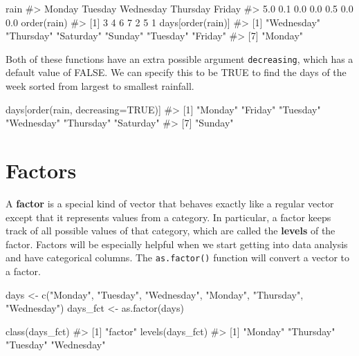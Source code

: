 \documentclass[
  letterpaper,
]{krantz}
\makeatletter
\newenvironment{Shaded}{\begin{snugshade}}{\end{snugshade}}
\newcommand{\AttributeTok}[1]{\textcolor[rgb]{0.40,0.45,0.13}{#1}}
\newcommand{\CommentTok}[1]{\textcolor[rgb]{0.37,0.37,0.37}{#1}}
\newcommand{\ConstantTok}[1]{\textcolor[rgb]{0.56,0.35,0.01}{#1}}
\newcommand{\FunctionTok}[1]{\textcolor[rgb]{0.28,0.35,0.67}{#1}}
\newcommand{\NormalTok}[1]{\textcolor[rgb]{0.00,0.23,0.31}{#1}}
\newcommand{\OtherTok}[1]{\textcolor[rgb]{0.00,0.23,0.31}{#1}}
\newcommand{\StringTok}[1]{\textcolor[rgb]{0.13,0.47,0.30}{#1}}
\newenvironment{kframe}{%
\medskip{}
\setlength{\fboxsep}{.8em}
 \def\at@end@of@kframe{}%
 \ifinner\ifhmode%
  \def\at@end@of@kframe{\end{minipage}}%
  \begin{minipage}{\columnwidth}%
 \fi\fi%
 \def\FrameCommand##1{\hskip\@totalleftmargin \hskip-\fboxsep
 \colorbox{shadecolor}{##1}\hskip-\fboxsep
     \hskip-\linewidth \hskip-\@totalleftmargin \hskip\columnwidth}%
 \MakeFramed {\advance\hsize-\width
   \@totalleftmargin\z@ \linewidth\hsize
   \@setminipage}}%
 {\par\unskip\endMakeFramed%
 \at@end@of@kframe}
\renewenvironment{Shaded}{\begin{kframe}}{\end{kframe}}
\makeatother
\begin{document}
\begin{Shaded}
\begin{Highlighting}[]
\NormalTok{rain}
\CommentTok{\#\textgreater{}    Monday   Tuesday Wednesday  Thursday    Friday                     }
\CommentTok{\#\textgreater{}       5.0       0.1       0.0       0.0       0.5       0.0       0.0}
\FunctionTok{order}\NormalTok{(rain)}
\CommentTok{\#\textgreater{} [1] 3 4 6 7 2 5 1}
\NormalTok{days[}\FunctionTok{order}\NormalTok{(rain)]}
\CommentTok{\#\textgreater{} [1] "Wednesday" "Thursday"  "Saturday"  "Sunday"    "Tuesday"   "Friday"   }
\CommentTok{\#\textgreater{} [7] "Monday"}
\end{Highlighting}
\end{Shaded}

Both of these functions have an extra possible argument
\texttt{decreasing}, which has a default value of FALSE. We can specify
this to be TRUE to find the days of the week sorted from largest to
smallest rainfall.

\begin{Shaded}
\begin{Highlighting}[]
\NormalTok{days[}\FunctionTok{order}\NormalTok{(rain, }\AttributeTok{decreasing=}\ConstantTok{TRUE}\NormalTok{)]}
\CommentTok{\#\textgreater{} [1] "Monday"    "Friday"    "Tuesday"   "Wednesday" "Thursday"  "Saturday" }
\CommentTok{\#\textgreater{} [7] "Sunday"}
\end{Highlighting}
\end{Shaded}

\hypertarget{factors}{%
\section{Factors}\label{factors}}

A \textbf{factor} is a special kind of vector that behaves exactly like
a regular vector except that it represents values from a category. In
particular, a factor keeps track of all possible values of that
category, which are called the \textbf{levels} of the factor. Factors
will be especially helpful when we start getting into data analysis and
have categorical columns. The \texttt{as.factor()} function will convert
a vector to a factor.

\begin{Shaded}
\begin{Highlighting}[]
\NormalTok{days }\OtherTok{\textless{}{-}} \FunctionTok{c}\NormalTok{(}\StringTok{"Monday"}\NormalTok{, }\StringTok{"Tuesday"}\NormalTok{, }\StringTok{"Wednesday"}\NormalTok{, }\StringTok{"Monday"}\NormalTok{, }
          \StringTok{"Thursday"}\NormalTok{, }\StringTok{"Wednesday"}\NormalTok{)}
\NormalTok{days\_fct }\OtherTok{\textless{}{-}} \FunctionTok{as.factor}\NormalTok{(days)}

\FunctionTok{class}\NormalTok{(days\_fct)}
\CommentTok{\#\textgreater{} [1] "factor"}
\FunctionTok{levels}\NormalTok{(days\_fct)}
\CommentTok{\#\textgreater{} [1] "Monday"    "Thursday"  "Tuesday"   "Wednesday"}
\end{Highlighting}
\end{Shaded}
\end{document}
